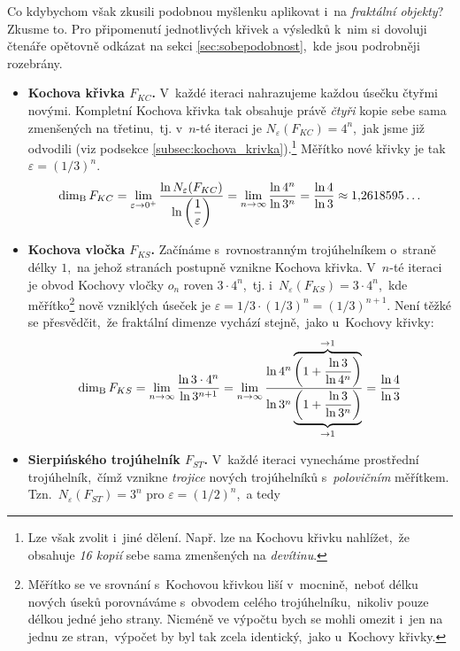Co kdybychom však zkusili podobnou myšlenku aplikovat i~na \emph{fraktální objekty}? Zkusme to. Pro připomenutí jednotlivých křivek a výsledků k~nim si dovoluji čtenáře opětovně odkázat na sekci \ref{sec:sobepodobnost},~kde jsou podrobněji rozebrány.
\begin{itemize}
    \item \textbf{Kochova křivka $F_{KC}$.} V~každé iteraci nahrazujeme každou úsečku čtyřmi novými. Kompletní Kochova křivka tak obsahuje právě \emph{čtyři} kopie sebe sama zmenšených na třetinu,~tj. v~$n$-té iteraci je $N_\varepsilon(F_{KC})=4^n$,~jak jsme již odvodili (viz podsekce \ref{subsec:kochova_krivka}).\footnote{Lze však zvolit i~jiné dělení. Např. lze na Kochovu křivku nahlížet,~že obsahuje \emph{16 kopií} sebe sama zmenšených na \emph{devítinu}.} Měřítko nové křivky je tak $\varepsilon=(1/3)^n$.
    \begin{equation}\label{eq:kochova-krivka-dimenze}
        \operatorname{dim_B}{F_{KC}}=\lim_{\varepsilon\to 0^+}{\dfrac{\ln{N_\varepsilon(F_{KC})}}{\ln{\left(\dfrac{1}{\varepsilon}\right)}}}=\lim_{n\to\infty}{\dfrac{\ln{4^n}}{\ln{3^n}}}=\dfrac{\ln{4}}{\ln{3}}\approx 1{,}2618595\dots
    \end{equation}
    \item \textbf{Kochova vločka $F_{KS}$.} Začínáme s~rovnostranným trojúhelníkem o~straně délky $1$,~na jehož stranách postupně vznikne Kochova křivka. V~$n$-té iteraci je obvod Kochovy vločky $o_n$ roven $3\cdot 4^n$,~tj. i~$N_\varepsilon(F_{KS})=3\cdot 4^n$,~kde měřítko\footnote{Měřítko se ve srovnání s~Kochovou křivkou liší v~mocnině,~neboť délku nových úseků porovnáváme s~obvodem celého trojúhelníku,~nikoliv pouze délkou jedné jeho strany. Nicméně ve výpočtu bych se mohli omezit i~jen na jednu ze stran,~výpočet by byl tak zcela identický,~jako u~Kochovy křivky.} nově vzniklých úseček je $\varepsilon=1/3\cdot(1/3)^n=(1/3)^{n+1}$. Není těžké se přesvědčit,~že fraktální dimenze vychází stejně,~jako u~Kochovy křivky:
    \begin{equation}\label{eq:kochova-vlocka-dimenze}
        \operatorname{dim_B}{F_{KS}}=\lim_{n\to\infty}{\dfrac{\ln{3\cdot 4^n}}{\ln{3^{n+1}}}}=\lim_{n\to\infty}{\dfrac{\ln{4^n}\overbrace{\left(1+\dfrac{\ln{3}}{\ln{4^n}}\right)}^{\to 1}}{\ln{3^n}\underbrace{\left(1+\dfrac{\ln{3}}{\ln{3^n}}\right)}_{\to 1}}}=\dfrac{\ln{4}}{\ln{3}}
    \end{equation}
    \item \textbf{Sierpińského trojúhelník $F_{ST}$.} V~každé iteraci vynecháme prostřední trojúhelník,~čímž vznikne \emph{trojice} nových trojúhelníků s~\emph{polovičním} měřítkem. Tzn.~$N_\varepsilon(F_{ST})=3^n$ pro $\varepsilon=(1/2)^n$,~a tedy

\end{itemize}
